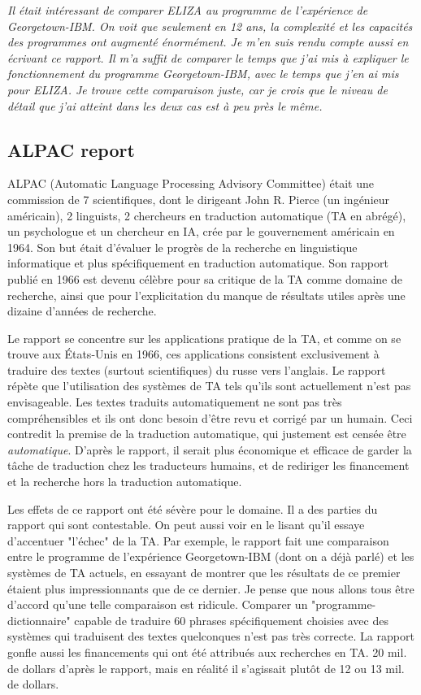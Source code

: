 \documentclass[11pt,a4paper]{report}
\begin{document}
  
  \textit{Il était intéressant de comparer ELIZA au programme de l'expérience de Georgetown-IBM. 
  On voit que seulement en 12 ans, la complexité et les capacités des programmes ont augmenté 
  énormément. Je m'en suis rendu compte aussi en écrivant ce rapport. Il m'a suffit de comparer 
  le temps que j'ai mis à expliquer le fonctionnement du programme Georgetown-IBM, avec le temps 
  que j'en ai mis pour ELIZA. Je trouve cette comparaison juste, car je crois que le niveau de 
  détail que j'ai atteint dans les deux cas est à peu près le même. }


  \subsection*{ALPAC report} 
  ALPAC (Automatic Language Processing Advisory Committee) était une commission de 7 scientifiques, 
  dont le dirigeant John R. Pierce (un ingénieur américain), 2 linguists, 2 chercheurs en traduction 
  automatique (TA en abrégé), un psychologue et un chercheur en IA, 
  crée par le gouvernement américain en 1964. Son but était d'évaluer le progrès de la 
  recherche en linguistique informatique et plus spécifiquement en traduction automatique. Son rapport 
  publié en 1966 est devenu célèbre pour sa critique de la TA comme domaine de recherche, 
  ainsi que pour l'explicitation du manque de résultats utiles après une dizaine d'années de recherche. 

  Le rapport se concentre sur les applications pratique de la TA, et comme on se trouve aux 
  États-Unis en 1966, ces applications consistent exclusivement à traduire des textes 
  (surtout scientifiques) du russe vers l'anglais. Le rapport répète que l'utilisation des 
  systèmes de TA tels qu'ils sont actuellement n'est pas envisageable. Les textes traduits 
  automatiquement ne sont pas très compréhensibles et ils ont donc besoin d'être revu et 
  corrigé par un humain. Ceci contredit la premise de la traduction automatique, qui justement est
  censée être \textit{automatique}. D'après le rapport, il serait plus économique et efficace 
  de garder la tâche de traduction chez les traducteurs humains, et de rediriger les financement 
  et la recherche hors la traduction automatique. 

  Les effets de ce rapport ont été sévère pour le domaine. Il a des parties du rapport qui sont 
  contestable. On peut aussi voir en le lisant qu'il essaye d'accentuer "l'échec" de la TA. 
  Par exemple, le rapport fait une comparaison entre le programme de l'expérience Georgetown-IBM 
  (dont on a déjà parlé) et les systèmes de TA actuels, en essayant de montrer que les résultats 
  de ce premier étaient plus impressionnants que de ce dernier. Je pense que nous allons tous être 
  d'accord qu'une telle comparaison est ridicule. Comparer un "programme-dictionnaire" capable 
  de traduire 60 phrases spécifiquement choisies avec des systèmes qui traduisent des textes 
  quelconques n'est pas très correcte. La rapport gonfle aussi les financements qui ont 
  été attribués aux recherches en TA. 20 mil. de dollars d'après le rapport, mais en réalité 
  il s'agissait plutôt de 12 ou 13 mil. de dollars. 
  
\end{document}
